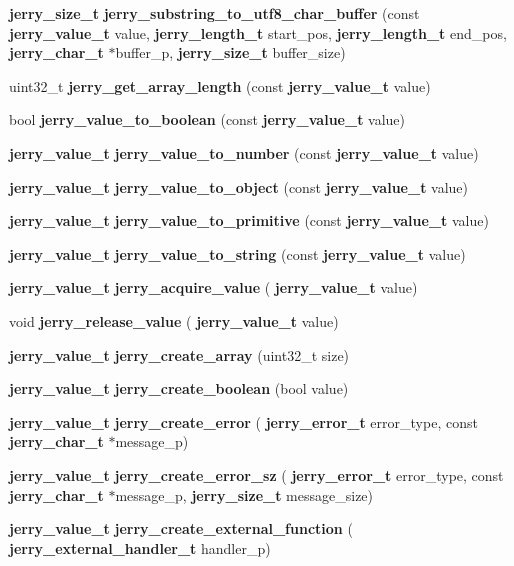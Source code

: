 \begin{DoxyCompactItemize}
\item 
\textbf{ jerry\+\_\+size\+\_\+t} {\bfseries jerry\+\_\+substring\+\_\+to\+\_\+utf8\+\_\+char\+\_\+buffer} (const \textbf{ jerry\+\_\+value\+\_\+t} value, \textbf{ jerry\+\_\+length\+\_\+t} start\+\_\+pos, \textbf{ jerry\+\_\+length\+\_\+t} end\+\_\+pos, \textbf{ jerry\+\_\+char\+\_\+t} $\ast$buffer\+\_\+p, \textbf{ jerry\+\_\+size\+\_\+t} buffer\+\_\+size)
\item 
uint32\+\_\+t \textbf{ jerry\+\_\+get\+\_\+array\+\_\+length} (const \textbf{ jerry\+\_\+value\+\_\+t} value)
\item 
bool \textbf{ jerry\+\_\+value\+\_\+to\+\_\+boolean} (const \textbf{ jerry\+\_\+value\+\_\+t} value)
\item 
\textbf{ jerry\+\_\+value\+\_\+t} {\bfseries jerry\+\_\+value\+\_\+to\+\_\+number} (const \textbf{ jerry\+\_\+value\+\_\+t} value)
\item 
\textbf{ jerry\+\_\+value\+\_\+t} {\bfseries jerry\+\_\+value\+\_\+to\+\_\+object} (const \textbf{ jerry\+\_\+value\+\_\+t} value)
\item 
\textbf{ jerry\+\_\+value\+\_\+t} {\bfseries jerry\+\_\+value\+\_\+to\+\_\+primitive} (const \textbf{ jerry\+\_\+value\+\_\+t} value)
\item 
\textbf{ jerry\+\_\+value\+\_\+t} {\bfseries jerry\+\_\+value\+\_\+to\+\_\+string} (const \textbf{ jerry\+\_\+value\+\_\+t} value)
\item 
\textbf{ jerry\+\_\+value\+\_\+t} \textbf{ jerry\+\_\+acquire\+\_\+value} (\textbf{ jerry\+\_\+value\+\_\+t} value)
\item 
void \textbf{ jerry\+\_\+release\+\_\+value} (\textbf{ jerry\+\_\+value\+\_\+t} value)
\item 
\textbf{ jerry\+\_\+value\+\_\+t} \textbf{ jerry\+\_\+create\+\_\+array} (uint32\+\_\+t size)
\item 
\textbf{ jerry\+\_\+value\+\_\+t} {\bfseries jerry\+\_\+create\+\_\+boolean} (bool value)
\item 
\textbf{ jerry\+\_\+value\+\_\+t} {\bfseries jerry\+\_\+create\+\_\+error} (\textbf{ jerry\+\_\+error\+\_\+t} error\+\_\+type, const \textbf{ jerry\+\_\+char\+\_\+t} $\ast$message\+\_\+p)
\item 
\textbf{ jerry\+\_\+value\+\_\+t} {\bfseries jerry\+\_\+create\+\_\+error\+\_\+sz} (\textbf{ jerry\+\_\+error\+\_\+t} error\+\_\+type, const \textbf{ jerry\+\_\+char\+\_\+t} $\ast$message\+\_\+p, \textbf{ jerry\+\_\+size\+\_\+t} message\+\_\+size)
\item 
\textbf{ jerry\+\_\+value\+\_\+t} {\bfseries jerry\+\_\+create\+\_\+external\+\_\+function} (\textbf{ jerry\+\_\+external\+\_\+handler\+\_\+t} handler\+\_\+p)

\end{DoxyCompactItemize}
